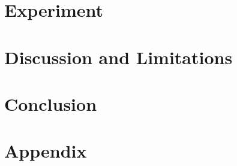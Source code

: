 \documentclass{article}
\begin{document}
\section{Experiment}

\section{Discussion and Limitations}


\section{Conclusion}

 


\section{Appendix}
\end{document}
